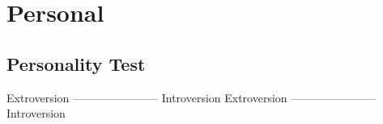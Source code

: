\section*{Personal}


\subsection*{Personality Test}



Extroversion ----------------------- Introversion   
Extroversion ----------------------- Introversion   


